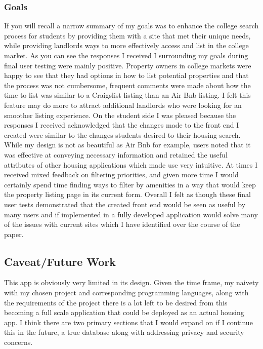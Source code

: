 \documentclass[10pt,twocolumn]{article}
\begin{document}
\subsubsection{Goals}
If you will recall a narrow summary of my goals was to enhance the college search process for students by providing them with a site that met their unique needs, while providing landlords ways to more effectively access and list in the college market. As you can see the responses I received I surrounding my goals during final user testing were mainly positive. Property owners in college markets were happy to see that they had options in how to list potential properties and that the process was not cumbersome, frequent comments were made about how the time to list was similar to a Craigslist listing than an Air Bnb listing. I felt this feature may do more to attract additional landlords who were looking for an smoother listing experience.
On the student side I was pleased because the responses I received acknowledged that the changes made to the front end I created were similar to the changes students desired to their housing search. While my design is not as beautiful as Air Bnb for example, users noted that it was effective at conveying necessary information and retained the useful attributes of other housing applications which made use very intuitive. At times I received mixed feedback on filtering priorities, and given more time I would certainly spend time finding ways to filter by amenities in a way that would keep the property listing page in its current form. Overall I felt as though these final user tests demonstrated that the created front end would be seen as useful by many users and if implemented in a fully developed application would solve many of the issues with current sites which I have identified over the course of the paper. 

\subsection{Caveat/Future Work}
This app is obviously very limited in its design. Given the time frame, my naivety with my chosen project and corresponding programming languages, along with the requirements of the project there is a lot left to be desired from this becoming a full scale application that could be deployed as an actual housing app. I think there are two primary sections that I would expand on if I continue this in the future, a true database along with addressing privacy and security concerns.
\end{document}
